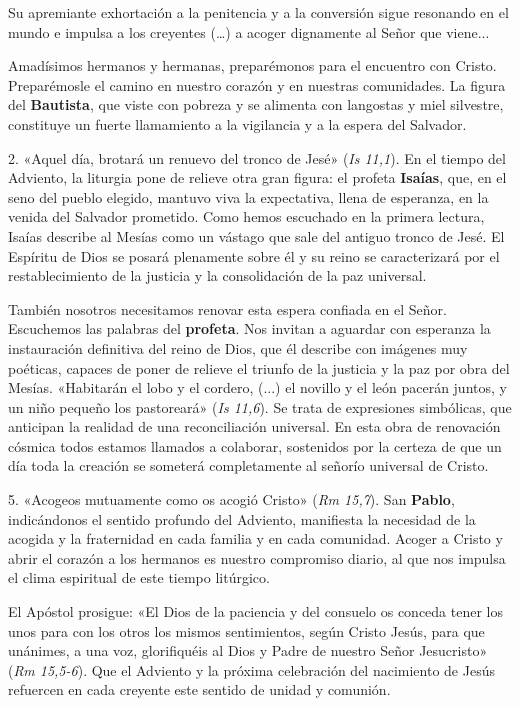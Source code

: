 \documentclass[]{article}
\begin{document}
Su apremiante exhortación a la penitencia y a la conversión sigue
resonando en el mundo e impulsa a los creyentes (\ldots{}) a acoger
dignamente al Señor que viene...

Amadísimos hermanos y hermanas, preparémonos para el encuentro con
Cristo. Preparémosle el camino en nuestro corazón y en nuestras
comunidades. La figura del \textbf{Bautista}, que viste con pobreza y se
alimenta con langostas y miel silvestre, constituye un fuerte
llamamiento a la vigilancia y a la espera del Salvador.

2. «Aquel día, brotará un renuevo del tronco de Jesé» (\emph{Is 11,1}).
En el tiempo del Adviento, la liturgia pone de relieve otra gran figura:
el profeta \textbf{Isaías}, que, en el seno del pueblo elegido, mantuvo
viva la expectativa, llena de esperanza, en la venida del Salvador
prometido. Como hemos escuchado en la primera lectura, Isaías describe
al Mesías como un vástago que sale del antiguo tronco de Jesé. El
Espíritu de Dios se posará plenamente sobre él y su reino se
caracterizará por el restablecimiento de la justicia y la consolidación
de la paz universal.

También nosotros necesitamos renovar esta espera confiada en el Señor.
Escuchemos las palabras del \textbf{profeta}. Nos invitan a aguardar con
esperanza la instauración definitiva del reino de Dios, que él describe
con imágenes muy poéticas, capaces de poner de relieve el triunfo de la
justicia y la paz por obra del Mesías. «Habitarán el lobo y el cordero,
(...) el novillo y el león pacerán juntos, y un niño pequeño los
pastoreará» (\emph{Is 11,6}). Se trata de expresiones simbólicas, que
anticipan la realidad de una reconciliación universal. En esta obra de
renovación cósmica todos estamos llamados a colaborar, sostenidos por la
certeza de que un día toda la creación se someterá completamente al
señorío universal de Cristo.

5. «Acogeos mutuamente como os acogió Cristo» (\emph{Rm 15,7}). San
\textbf{Pablo}, indicándonos el sentido profundo del Adviento,
manifiesta la necesidad de la acogida y la fraternidad en cada familia y
en cada comunidad. Acoger a Cristo y abrir el corazón a los hermanos es
nuestro compromiso diario, al que nos impulsa el clima espiritual de
este tiempo litúrgico.

El Apóstol prosigue: «El Dios de la paciencia y del consuelo os conceda
tener los unos para con los otros los mismos sentimientos, según Cristo
Jesús, para que unánimes, a una voz, glorifiquéis al Dios y Padre de
nuestro Señor Jesucristo» (\emph{Rm 15,5-6}). Que el Adviento y la
próxima celebración del nacimiento de Jesús refuercen en cada creyente
este sentido de unidad y comunión.
\end{document}
